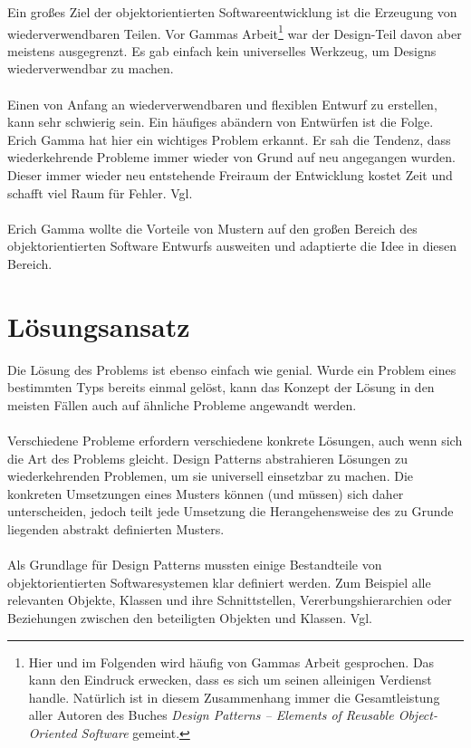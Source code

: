 \documentclass[fontsize=11pt,a4paper,final]{scrreprt}[2003/01/01]
\begin{document}
Ein großes Ziel der objektorientierten Softwareentwicklung ist die Erzeugung von wiederverwendbaren Teilen. Vor Gammas Arbeit\footnote{Hier und im Folgenden wird häufig von \glqq Gammas Arbeit\grqq{} gesprochen. Das kann den Eindruck erwecken, dass es sich um seinen alleinigen Verdienst handle. Natürlich ist in diesem Zusammenhang immer die Gesamtleistung aller Autoren des Buches \textit{Design Patterns – Elements of Reusable Object-Oriented Software} \cite{gamma2004} gemeint.} war der Design-Teil davon aber meistens ausgegrenzt. Es gab einfach kein universelles Werkzeug, um Designs wiederverwendbar zu machen.
\\ \\
Einen von Anfang an wiederverwendbaren und flexiblen Entwurf zu erstellen, kann sehr schwierig sein. Ein häufiges abändern von Entwürfen ist die Folge. Erich Gamma hat hier ein wichtiges Problem erkannt. Er sah die Tendenz, dass wiederkehrende Probleme immer wieder von Grund auf neu angegangen wurden. Dieser immer wieder neu entstehende Freiraum der Entwicklung kostet Zeit und schafft viel Raum für Fehler. Vgl. \cite[S. 1]{gamma2004}
\\ \\
Erich Gamma wollte die Vorteile von Mustern auf den großen Bereich des objektorientierten Software Entwurfs ausweiten und adaptierte die Idee in diesen Bereich.

\section{Lösungsansatz}\label{se:Lösungsansatz}

Die Lösung des Problems ist ebenso einfach wie genial. Wurde ein Problem eines bestimmten Typs bereits einmal gelöst, kann das Konzept der Lösung in den meisten Fällen auch auf ähnliche Probleme angewandt werden.
\\ \\
Verschiedene Probleme erfordern verschiedene konkrete Lösungen, auch wenn sich die Art des Problems gleicht. Design Patterns abstrahieren Lösungen zu wiederkehrenden Problemen, um sie universell einsetzbar zu machen. Die konkreten Umsetzungen eines Musters können (und müssen) sich daher unterscheiden, jedoch teilt jede Umsetzung die Herangehensweise des zu Grunde liegenden abstrakt definierten Musters.
\\ \\
Als Grundlage für Design Patterns mussten einige Bestandteile von objektorientierten Softwaresystemen klar definiert werden. Zum Beispiel alle relevanten Objekte, Klassen und ihre Schnittstellen, Vererbungshierarchien oder Beziehungen zwischen den beteiligten Objekten und Klassen. Vgl. \cite[S. 1]{gamma2004}
\end{document}
